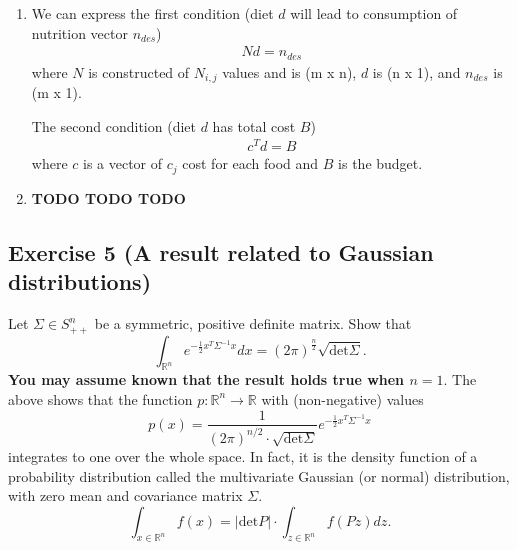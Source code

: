 \documentclass[11pt]{article}
\begin{document}
\begin{solution}
\begin{enumerate}
    \item We can express the first condition (diet $d$ will lead to consumption of nutrition vector $n_{des}$)
        \begin{align*}
            N d = n_{des}
        \end{align*}
        where $N$ is constructed of $N_{i,j}$ values and is (m x n), $d$ is (n x 1), and $n_{des}$ is (m x 1).

        The second condition (diet $d$ has total cost $B$)
        \begin{align*}
            c^T d = B
        \end{align*}
        where $c$ is a vector of $c_j$ cost for each food and $B$ is the budget.

    \item \textbf{TODO TODO TODO}
\end{enumerate}
\end{solution}

\newpage
\subsection*{Exercise 5 (A result related to Gaussian distributions)}

Let $\Sigma \in S^n_{++}$ be a symmetric, positive definite matrix. Show that
$$
\int_{\mathbb{R}^n} e^{-\frac{1}{2}x^T \Sigma^{-1} x} dx
= (2 \pi)^{\frac{n}{2}} \sqrt{\text{det} \Sigma}.
$$
\textbf{You may assume known that the result holds true when $n = 1$}. The above shows that the function $p : \mathbb{R}^n \rightarrow \mathbb{R}$ with (non-negative) values
$$
p(x) = \frac{1}{(2\pi)^{n/2} \cdot \sqrt{\text{det} \Sigma}} e^{-\frac{1}{2} x^T \Sigma^{-1} x}
$$
integrates to one over the whole space. In fact, it is the density function of a probability distribution called the multivariate Gaussian (or normal) distribution, with zero mean and covariance matrix $\Sigma$.
$$
\int_{x \in \mathbb{R}^n} f(x)
=
|\text{det} P| \cdot \int_{z \in \mathbb{R}^n} f(Pz) dz.
$$
\end{document}
